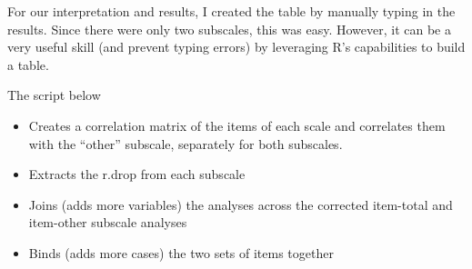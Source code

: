 \documentclass[
  english,
]{book}
\providecommand{\tightlist}{%
  \setlength{\itemsep}{0pt}\setlength{\parskip}{0pt}}
\begin{document}
For our interpretation and results, I created the table by manually typing in the results. Since there were only two subscales, this was easy. However, it can be a very useful skill (and prevent typing errors) by leveraging R's capabilities to build a table.

The script below

\begin{itemize}
\tightlist
\item
  Creates a correlation matrix of the items of each scale and correlates them with the ``other'' subscale, separately for both subscales.
\item
  Extracts the r.drop from each subscale
\item
  Joins (adds more variables) the analyses across the corrected item-total and item-other subscale analyses
\item
  Binds (adds more cases) the two sets of items together
\end{itemize}
\end{document}
